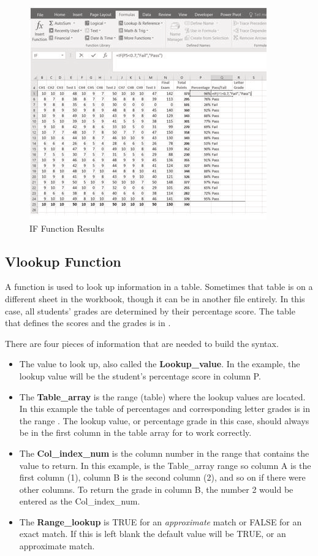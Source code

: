 \begin{figure}[H]
	\centering
	\includegraphics[width=\maxwidth{.95\linewidth}]{gfx/ch03_fig11}
	\caption{IF Function Results}
	\label{03:fig11}
\end{figure}

\subsection{Vlookup Function}

A  function is used to look up information in a table. Sometimes that table is on a different sheet in the workbook, though it can be in another file entirely. In this case, all students' grades are determined by their percentage score. The table that defines the scores and the grades is in .

There are four pieces of information that are needed to build the  syntax. 

\begin{itemize}
	\item The value to look up, also called the \textbf{Lookup\_value}. In the example, the lookup value will be the student's percentage score in column P.
	\item The \textbf{Table\_array} is the range (table) where the lookup values are located. In this example the table of percentages and corresponding letter grades is in the range . The lookup value, or percentage grade in this case, should always be in the first column in the table array for  to work correctly. 
	\item The \textbf{Col\_index\_num} is the column number in the range that contains the value to return. In this example,  is the Table\_array range so column A is the first column (1), column B is the second column (2), and so on if there were other columns. To return the grade in column B, the number 2 would be entered as the Col\_index\_num.
	\item The \textbf{Range\_lookup} is TRUE for an \textit{approximate} match or FALSE for an exact match. If this is left blank the default value will be TRUE, or an approximate match.
\end{itemize}

